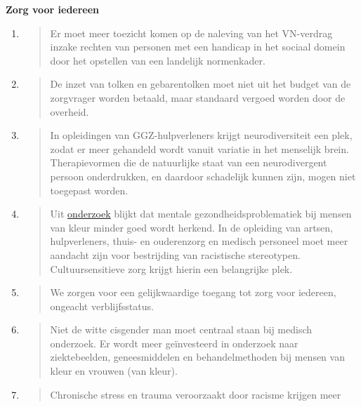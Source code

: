 \textbf{Zorg voor iedereen}

\begin{enumerate}
\def\labelenumi{\arabic{enumi}.}
\item
  \begin{quote}
  Er moet meer toezicht komen op de naleving van het VN-verdrag inzake
  rechten van personen met een handicap in het sociaal domein door het
  opstellen van een landelijk normenkader.
  \end{quote}
\item
  \begin{quote}
  De inzet van tolken en gebarentolken moet niet uit het budget van de
  zorgvrager worden betaald, maar standaard vergoed worden door de
  overheid.
  \end{quote}
\item
  \begin{quote}
  In opleidingen van GGZ-hulpverleners krijgt neurodiversiteit een plek,
  zodat er meer gehandeld wordt vanuit variatie in het menselijk brein.
  Therapievormen die de natuurlijke staat van een neurodivergent persoon
  onderdrukken, en daardoor schadelijk kunnen zijn, mogen niet toegepast
  worden.
  \end{quote}
\item
  \begin{quote}
  Uit
  \href{http://www.kis.nl/rol-etniciteit-basiszorg-jeugd-ggz}{\underline{onderzoek}}
  blijkt dat mentale gezondheidsproblematiek bij mensen van kleur minder
  goed wordt herkend. In de opleiding van artsen, hulpverleners, thuis-
  en ouderenzorg en medisch personeel moet meer aandacht zijn voor
  bestrijding van racistische stereotypen. Cultuursensitieve zorg krijgt
  hierin een belangrijke plek.~
  \end{quote}
\item
  \begin{quote}
  We zorgen voor een gelijkwaardige toegang tot zorg voor iedereen,
  ongeacht verblijfsstatus.
  \end{quote}
\item
  \begin{quote}
  Niet de witte cisgender man moet centraal staan bij medisch onderzoek.
  Er wordt meer geïnvesteerd in onderzoek naar ziektebeelden,
  geneesmiddelen en behandelmethoden bij mensen van kleur en vrouwen
  (van kleur).
  \end{quote}
\item
  \begin{quote}
  Chronische stress en trauma veroorzaakt door racisme krijgen meer

\end{quote}
\end{enumerate}
